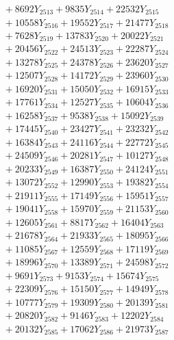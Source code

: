 \documentclass[a4paper,10pt]{article}
\begin{document}
{\begin{align}
&\;  + 8692 Y_{2513} + 9835 Y_{2514} + 22532 Y_{2515} \\[0.3ex]
&\;  + 10558 Y_{2516} + 19552 Y_{2517} + 21477 Y_{2518} \\[0.5ex]\allowbreak
&\;  + 7628 Y_{2519} + 13783 Y_{2520} + 20022 Y_{2521} \\[0.3ex]
&\;  + 20456 Y_{2522} + 24513 Y_{2523} + 22287 Y_{2524} \\[0.3ex]
&\;  + 13278 Y_{2525} + 24378 Y_{2526} + 23620 Y_{2527} \\[0.3ex]
&\;  + 12507 Y_{2528} + 14172 Y_{2529} + 23960 Y_{2530} \\[0.3ex]
&\;  + 16920 Y_{2531} + 15050 Y_{2532} + 16915 Y_{2533} \\[0.3ex]
&\;  + 17761 Y_{2534} + 12527 Y_{2535} + 10604 Y_{2536} \\[0.3ex]
&\;  + 16258 Y_{2537} + 9538 Y_{2538} + 15092 Y_{2539} \\[0.3ex]
&\;  + 17445 Y_{2540} + 23427 Y_{2541} + 23232 Y_{2542} \\[0.3ex]
&\;  + 16384 Y_{2543} + 24116 Y_{2544} + 22772 Y_{2545} \\[0.3ex]
&\;  + 24509 Y_{2546} + 20281 Y_{2547} + 10127 Y_{2548} \\[0.5ex]\allowbreak
&\;  + 20233 Y_{2549} + 16387 Y_{2550} + 24124 Y_{2551} \\[0.3ex]
&\;  + 13072 Y_{2552} + 12990 Y_{2553} + 19382 Y_{2554} \\[0.3ex]
&\;  + 21911 Y_{2555} + 17149 Y_{2556} + 15951 Y_{2557} \\[0.3ex]
&\;  + 19041 Y_{2558} + 15970 Y_{2559} + 21153 Y_{2560} \\[0.3ex]
&\;  + 12605 Y_{2561} + 8817 Y_{2562} + 16404 Y_{2563} \\[0.3ex]
&\;  + 21678 Y_{2564} + 21933 Y_{2565} + 18095 Y_{2566} \\[0.3ex]
&\;  + 11085 Y_{2567} + 12559 Y_{2568} + 17119 Y_{2569} \\[0.3ex]
&\;  + 18996 Y_{2570} + 13389 Y_{2571} + 24598 Y_{2572} \\[0.3ex]
&\;  + 9691 Y_{2573} + 9153 Y_{2574} + 15674 Y_{2575} \\[0.3ex]
&\;  + 22309 Y_{2576} + 15150 Y_{2577} + 14949 Y_{2578} \\[0.5ex]\allowbreak
&\;  + 10777 Y_{2579} + 19309 Y_{2580} + 20139 Y_{2581} \\[0.3ex]
&\;  + 20820 Y_{2582} + 9146 Y_{2583} + 12202 Y_{2584} \\[0.3ex]
&\;  + 20132 Y_{2585} + 17062 Y_{2586} + 21973 Y_{2587} \\[0.3ex]

\end{align}}
\end{document}
